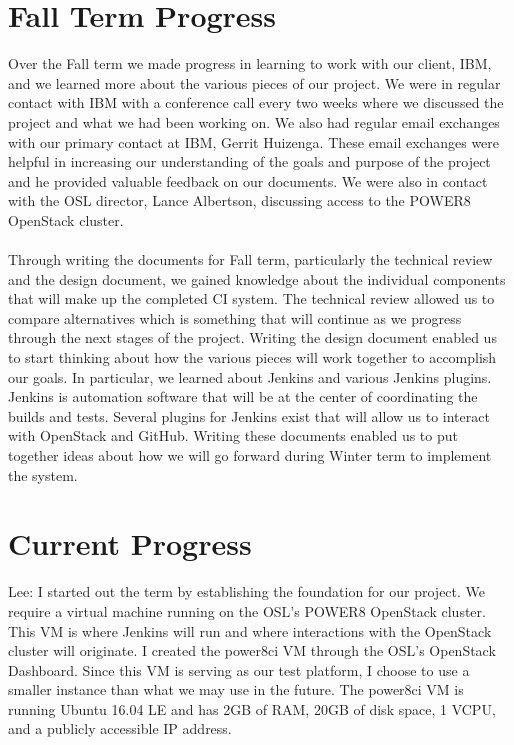 \documentclass[10pt,onecolumn,journal,draftclsnofoot]{IEEEtran}
\begin{document}
\section{Fall Term Progress}
Over the Fall term we made progress in learning to work with our client, IBM, and we learned more about the various pieces of our project.
We were in regular contact with IBM with a conference call every two weeks where we discussed the project and what we had been working on.
We also had regular email exchanges with our primary contact at IBM, Gerrit Huizenga.
These email exchanges were helpful in increasing our understanding of the goals and purpose of the project and he provided valuable feedback on our documents.
We were also in contact with the OSL director, Lance Albertson, discussing access to the POWER8 OpenStack cluster.
\\
\\
Through writing the documents for Fall term, particularly the technical review and the design document, we gained knowledge about the individual components that will make up the completed CI system.
The technical review allowed us to compare alternatives which is something that will continue as we progress through the next stages of the project.
Writing the design document enabled us to start thinking about how the various pieces will work together to accomplish our goals.
In particular, we learned about Jenkins and various Jenkins plugins.
Jenkins is automation software that will be at the center of coordinating the builds and tests.
Several plugins for Jenkins exist that will allow us to interact with OpenStack and GitHub.
Writing these documents enabled us to put together ideas about how we will go forward during Winter term to implement the system.

\section{Current Progress}

Lee:
I started out the term by establishing the foundation for our project.
We require a virtual machine running on the OSL's POWER8 OpenStack cluster.
This VM is where Jenkins will run and where interactions with the OpenStack cluster will originate.
I created the power8ci VM through the OSL's OpenStack Dashboard.
Since this VM is serving as our test platform, I choose to use a smaller instance than what we may use in the future.
The power8ci VM is running Ubuntu 16.04 LE and has 2GB of RAM, 20GB of disk space, 1 VCPU, and a publicly accessible IP address.
\end{document}

